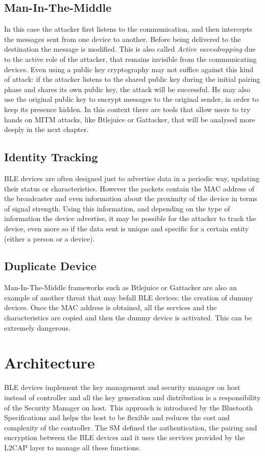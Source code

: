 \subsection{Man-In-The-Middle}
In this case the attacker first listens to the communication, and then intercepts the messages sent from one device to another. Before being delivered to the destination the message is modified.
This is also called \textit{Active eavesdropping} due to the active role of the attacker, that remains invisible from the communicating devices. 
Even using a public key cryptography may not suffice against this kind of attack: if the attacker listens to the shared public key during the initial pairing phase and shares its own public key, the attack will be successful.
He may also use the original public key to encrypt messages to the original sender, in order to keep its presence hidden.
In this context there are tools that allow users to try hands on MITM attacks, like Btlejuice or Gattacker, that will be analysed more deeply in the next chapter.

\subsection{Identity Tracking}
BLE devices are often designed just to advertise data in a periodic way, updating their status or characteristics. However the packets contain the MAC address of the broadcaster and even information about the proximity of the device in terms of signal strength.
Using this information, and depending on the type of information the device advertise, it may be possible for the attacker to track the device, even more so if the data sent is unique and specific for a certain entity (either a person or a device).

\subsection{Duplicate Device}
Man-In-The-Middle frameworks such as Btlejuice or Gattacker are also an example of another threat that may befall BLE devices: the creation of dummy devices. Once the MAC address is obtained, all the services and the characteristics are copied and then the dummy device is activated.
This can be extremely dangerous.

\section{Architecture}
BLE devices implement the key management and security manager on host instead of controller and all the key generation and distribution is a responsibility of the Security Manager on host.
This approach is introduced by the Bluetooth Specifications and helps the host to be flexible and reduces the cost and complexity of the controller.
The SM defined the authentication, the pairing and encryption between the BLE devices and it uses the services provided by the L2CAP layer to manage all these functions.

